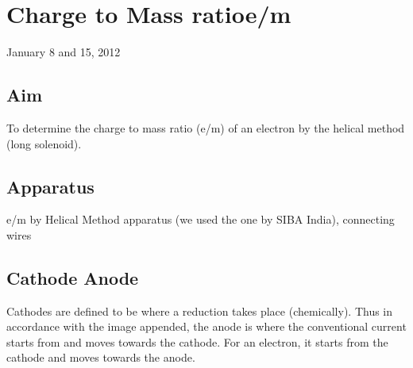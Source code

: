 \chapter{Charge to Mass ratioe/m}
\begin{flushright}
January 8 and 15, 2012
\end{flushright}
\section{Aim}
	To determine the charge to mass ratio (e/m) of an electron by the helical method (long solenoid).
\section{Apparatus}
	e/m by Helical Method apparatus (we used the one by SIBA India), connecting wires

\section{Cathode Anode}
	Cathodes are defined to be where a reduction takes place (chemically). Thus in accordance with the image appended, the anode is where the conventional current starts from and moves towards the cathode. For an electron, it starts from the cathode and moves towards the anode.
